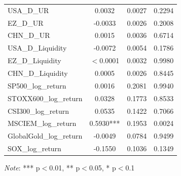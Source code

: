 \begin{tabular}{lccc}
  USA\_D\_UR & 0.0032 & 0.0027 & 0.2294 \\ 
  EZ\_D\_UR & -0.0033 & 0.0026 & 0.2008 \\ 
  CHN\_D\_UR & 0.0015 & 0.0036 & 0.6714 \\ 
  USA\_D\_Liquidity & -0.0072 & 0.0054 & 0.1786 \\ 
  EZ\_D\_Liquidity & $<$0.0001 & 0.0032 & 0.9980 \\ 
  CHN\_D\_Liquidity & 0.0005 & 0.0026 & 0.8445 \\ 
  SP500\_log\_return & 0.0016 & 0.2081 & 0.9940 \\ 
  STOXX600\_log\_return & 0.0328 & 0.1773 & 0.8533 \\ 
  CSI300\_log\_return & 0.0535 & 0.1422 & 0.7066 \\ 
  MSCIEM\_log\_return & 0.5930*** & 0.1953 & 0.0024 \\ 
  GlobalGold\_log\_return & -0.0049 & 0.0784 & 0.9499 \\ 
  SOX\_log\_return & -0.1550 & 0.1036 & 0.1349 \\ 
  \bottomrule
\end{tabular}
\par\vspace{4pt}
\begin{minipage}{\linewidth}
  \footnotesize \textit{Note}: *** p$<$0.01, ** p$<$0.05, * p$<$0.1
\end{minipage}